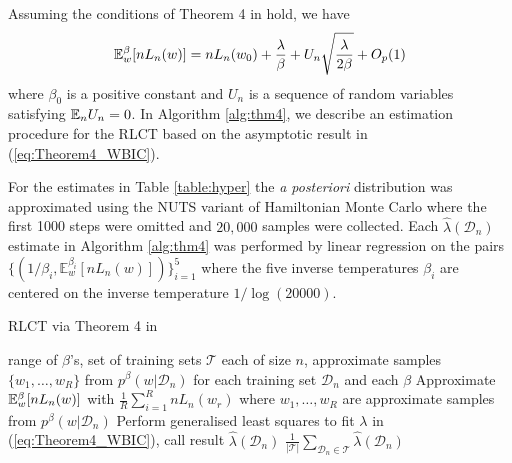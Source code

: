 \documentclass{article} %
\begin{document}
Assuming the conditions of Theorem 4 in \citet{watanabe_widely_2013} hold, we have
\begin{equation}
{\mathbb{E}}_w^\beta [nL_n(w)] = nL_n(w_0) + \frac{\lambda }{\beta} + U_n \sqrt{\frac{\lambda}{2 \beta}} + O_p(1)
\label{eq:Theorem4_WBIC}
\end{equation}
where $\beta_0$ is a positive constant and $U_n$ is a sequence of random variables satisfying ${\mathbb{E}}_n U_n = 0$. %
In Algorithm \ref{alg:thm4}, we describe an estimation procedure for the RLCT based on the asymptotic result in (\ref{eq:Theorem4_WBIC}).

For the estimates in Table \ref{table:hyper} the \emph{a posteriori} distribution was approximated using the NUTS variant of Hamiltonian Monte Carlo \citep{hoffman2014no} where the first 1000 steps were omitted and $20,000$ samples were collected.  Each $\hat \lambda(\mathcal D_n)$ estimate in Algorithm \ref{alg:thm4} was performed by linear regression on the pairs $\{ (1/\beta_i, \mathbb{E}^{\beta_i}_w[ nL_n(w) ] ) \}_{i=1}^5$ where the five inverse temperatures $\beta_i$ are centered on the inverse temperature $1/\log(20000)$.

\begin{algorithm}[tb]
	\caption{RLCT via Theorem 4  in \citet{watanabe_widely_2013}}
	\label{alg:thm4}
	\begin{algorithmic}
		 range of $\beta$'s, set of training sets $\mathcal T$ each of size $n$, approximate samples $\{w_1,\ldots,w_R\}$ from $p^\beta(w|\mathcal D_n)$ for each training set $\mathcal D_n$ and each $\beta$
		\STATE Approximate ${\mathbb{E}}_w^\beta [nL_n(w)]$ with $\frac{1}{R} \sum_{i=1}^R nL_n(w_r)$ where $w_1,\ldots,w_R$ are approximate samples from $p^\beta(w|\mathcal D_n)$
		\ENDFOR
		\STATE Perform generalised least squares to fit $\lambda$ in (\ref{eq:Theorem4_WBIC}), call result $\hat \lambda(\mathcal D_n)$
		\ENDFOR
		 $\frac{1}{|\mathcal T|} \sum_{\mathcal D_n \in \mathcal T} \hat \lambda(\mathcal D_n)$
	\end{algorithmic}
\end{algorithm}
\end{document}
